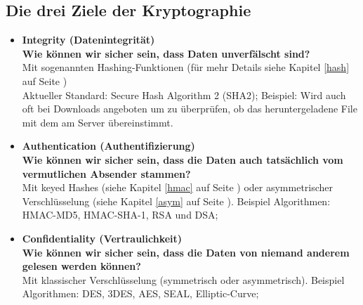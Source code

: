 \documentclass[10pt,a4paper,titlepage]{article}
\begin{document}
\subsection{Die drei Ziele der Kryptographie}
\begin{itemize}
\item \textbf{Integrity (Datenintegrität)\\ Wie können wir sicher sein, dass Daten unverfälscht sind?}\\ Mit sogenannten Hashing-Funktionen (für mehr Details siehe Kapitel \ref{hash} auf Seite \pageref{hash})\\ Aktueller Standard: Secure Hash Algorithm 2 (SHA2); Beispiel: Wird auch oft bei Downloads angeboten um zu überprüfen, ob das heruntergeladene File mit dem am Server übereinstimmt. 
\item \textbf{Authentication (Authentifizierung)\\ Wie können wir sicher sein, dass die Daten auch tatsächlich vom vermutlichen Absender stammen?}\\Mit keyed Hashes (siehe Kapitel \ref{hmac} auf Seite \pageref{hmac}) oder asymmetrischer Verschlüsselung (siehe Kapitel \ref{asym} auf Seite \pageref{asym}). Beispiel Algorithmen: HMAC-MD5, HMAC-SHA-1, RSA und DSA;
\item \textbf{Confidentiality (Vertraulichkeit)\\ Wie können wir sicher sein, dass die Daten von niemand anderem gelesen werden können?}\\Mit klassischer Verschlüsselung (symmetrisch oder asymmetrisch). Beispiel Algorithmen: DES, 3DES, AES, SEAL, Elliptic-Curve;
\end{itemize}

\newpage
\end{document}
